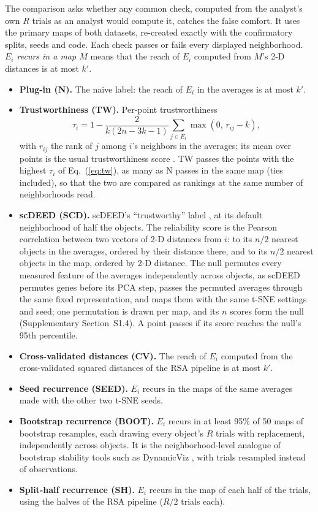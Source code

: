 \documentclass[11pt]{article}
\begin{document}
The comparison asks whether any common check, computed from the analyst's own $R$ trials as an analyst would compute it, catches the false comfort.
It uses the primary maps of both datasets, re-created exactly with the confirmatory splits, seeds and code.
Each check passes or fails every displayed neighborhood.
\emph{$E_i$ recurs in a map $M$} means that the reach of $E_i$ computed from $M$'s 2-D distances is at most $k'$.
\begin{itemize}[leftmargin=*]
  \item \textbf{Plug-in (N).} The naive label: the reach of $E_i$ in the averages is at most $k'$.
  \item \textbf{Trustworthiness (TW).} Per-point trustworthiness
  \begin{equation}
  \tau_i=1-\frac{2}{k(2n-3k-1)}\sum_{j\in E_i}\max(0,\,r_{ij}-k),\label{eq:tw}
  \end{equation}
  with $r_{ij}$ the rank of $j$ among $i$'s neighbors in the averages; its mean over points is the usual trustworthiness score \citep{venna2001,kaski2003}.
  TW passes the points with the highest $\tau_i$ of Eq.~(\ref{eq:tw}), as many as N passes in the same map (ties included), so that the two are compared as rankings at the same number of neighborhoods read.
  \item \textbf{scDEED (SCD).} scDEED's ``trustworthy'' label \citep{xia2024}, at its default neighborhood of half the objects.
  The reliability score is the Pearson correlation between two vectors of 2-D distances from $i$: to its $n/2$ nearest objects in the averages, ordered by their distance there, and to its $n/2$ nearest objects in the map, ordered by 2-D distance.
  The null permutes every measured feature of the averages independently across objects, as scDEED permutes genes before its PCA step, passes the permuted averages through the same fixed representation, and maps them with the same t-SNE settings and seed; one permutation is drawn per map, and its $n$ scores form the null (Supplementary Section~S1.4).
  A point passes if its score reaches the null's 95th percentile.
  \item \textbf{Cross-validated distances (CV).} The reach of $E_i$ computed from the cross-validated squared distances of the RSA pipeline is at most $k'$.
  \item \textbf{Seed recurrence (SEED).} $E_i$ recurs in the maps of the same averages made with the other two t-SNE seeds.
  \item \textbf{Bootstrap recurrence (BOOT).} $E_i$ recurs in at least 95\% of 50 maps of bootstrap resamples, each drawing every object's $R$ trials with replacement, independently across objects.
  It is the neighborhood-level analogue of bootstrap stability tools such as DynamicViz \citep{sun2023}, with trials resampled instead of observations.
  \item \textbf{Split-half recurrence (SH).} $E_i$ recurs in the map of each half of the trials, using the halves of the RSA pipeline ($R/2$ trials each).
\end{itemize}
\end{document}
